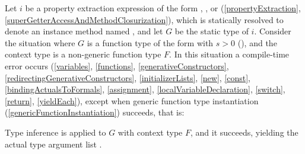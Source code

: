\documentclass[makeidx]{article}
\begin{document}
{\LMHash{}%
Let $i$ be a property extraction expression of the form
, , or 
(\ref{propertyExtraction}, \ref{superGetterAccessAndMethodClosurization}),
which is statically resolved to denote an instance method named \id,
and let $G$ be the static type of $i$.
Consider the situation where $G$ is a function type of the form
with $s > 0$
(),
and the context type is a non-generic function type $F$.
In this situation a compile-time error occurs
(\ref{variables},
\ref{functions},
\ref{generativeConstructors},
\ref{redirectingGenerativeConstructors},
\ref{initializerLists},
\ref{new},
\ref{const},
\ref{bindingActualsToFormals},
\ref{assignment},
\ref{localVariableDeclaration},
\ref{switch},
\ref{return},
\ref{yieldEach}),
except when generic function type instantiation
(\ref{genericFunctionInstantiation})
succeeds, that is:

\LMHash{}%
Type inference is applied to $G$ with context type $F$,
and it succeeds, yielding the actual type argument list
.

{ %

\def\gmiName{\metavar{gmiName\ensuremath{_{\id}}}}

}}
\end{document}
